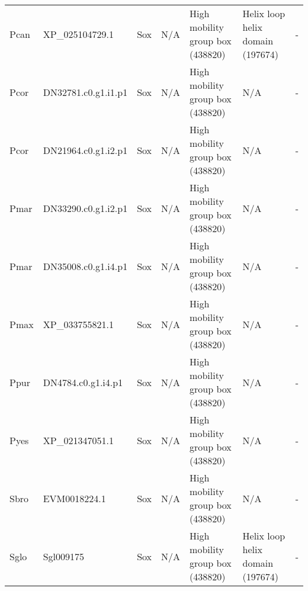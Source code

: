 \documentclass[../main.tex]{subfiles}
\begin{document}
\begin{landscape}
\begin{longtable}{lllllll}
		Pcan           & XP\_025104729.1       & Sox            & N/A                 & High mobility group box (438820)            & Helix loop helix domain (197674)                                       & -                    \\
		Pcor           & DN32781.c0.g1.i1.p1   & Sox            & N/A                 & High mobility group box (438820)            & N/A                                                                    & -                    \\
		Pcor           & DN21964.c0.g1.i2.p1   & Sox            & N/A                 & High mobility group box (438820)            & N/A                                                                    & -                    \\
		Pmar           & DN33290.c0.g1.i2.p1   & Sox            & N/A                 & High mobility group box (438820)            & N/A                                                                    & -                    \\
		Pmar           & DN35008.c0.g1.i4.p1   & Sox            & N/A                 & High mobility group box (438820)            & N/A                                                                    & -                    \\
		Pmax           & XP\_033755821.1       & Sox            & N/A                 & High mobility group box (438820)            & N/A                                                                    & -                    \\
		Ppur           & DN4784.c0.g1.i4.p1    & Sox            & N/A                 & High mobility group box (438820)            & N/A                                                                    & -                    \\
		Pyes           & XP\_021347051.1       & Sox            & N/A                 & High mobility group box (438820)            & N/A                                                                    & -                    \\
		Sbro           & EVM0018224.1          & Sox            & N/A                 & High mobility group box (438820)            & N/A                                                                    & -                    \\
		Sglo           & Sgl009175             & Sox            & N/A                 & High mobility group box (438820)            & Helix loop helix domain (197674)                                       & -                    \\

\end{longtable}
\end{landscape}
\end{document}
